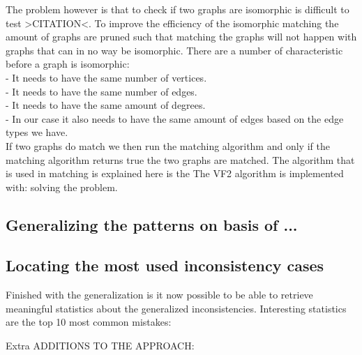 \documentclass{article}
\begin{document}
The problem however is that to check if two graphs are isomorphic is difficult to test >CITATION<. 
To improve the efficiency of the isomorphic matching the amount of graphs are pruned such that matching the graphs will not happen with graphs that can in no way be isomorphic. There are a number of characteristic before a graph is isomorphic:\\
 - It needs to have the same number of vertices.\\
 - It needs to have the same number of edges.\\
 - It needs to have the same amount of degrees.\\
 - In our case it also needs to have the same amount of edges based on the edge types we have.\\
 
If two graphs do match we then run the matching algorithm and only if the matching algorithm returns true the two graphs are matched.
The algorithm that is used in matching is explained here is the The VF2 algorithm\cite{LCordella2004} is implemented with: solving the problem. %


\subsection{Generalizing the patterns on basis of ...}


\subsection{Locating the most used inconsistency cases}
Finished with the generalization is it now possible to be able to retrieve meaningful statistics about the generalized inconsistencies. Interesting statistics are the top 10 most common mistakes:


Extra ADDITIONS TO THE APPROACH:
\end{document}
